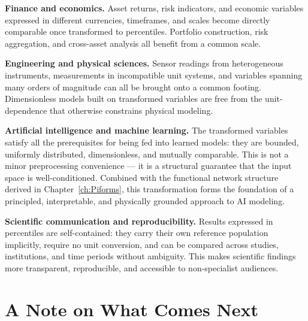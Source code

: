 \noindent\textbf{Finance and economics.} Asset returns, risk indicators, and economic
variables expressed in different currencies, timeframes, and scales become directly
comparable once transformed to percentiles. Portfolio construction, risk aggregation,
and cross-asset analysis all benefit from a common scale.

\noindent\textbf{Engineering and physical sciences.} Sensor readings from heterogeneous
instruments, measurements in incompatible unit systems, and variables spanning many
orders of magnitude can all be brought onto a common footing. Dimensionless models
built on transformed variables are free from the unit-dependence that otherwise
constrains physical modeling.

\noindent\textbf{Artificial intelligence and machine learning.} The transformed
variables satisfy all the prerequisites for being fed into learned models: they are
bounded, uniformly distributed, dimensionless, and mutually comparable. This is not a
minor preprocessing convenience — it is a structural guarantee that the input space
is well-conditioned. Combined with the functional network structure derived in
Chapter~\ref{ch:Piforms}, this transformation forms the foundation of a principled,
interpretable, and physically grounded approach to AI modeling.

\noindent\textbf{Scientific communication and reproducibility.} Results expressed in
percentiles are self-contained: they carry their own reference population implicitly,
require no unit conversion, and can be compared across studies, institutions, and
time periods without ambiguity. This makes scientific findings more transparent,
reproducible, and accessible to non-specialist audiences.


\section{A Note on What Comes Next}

